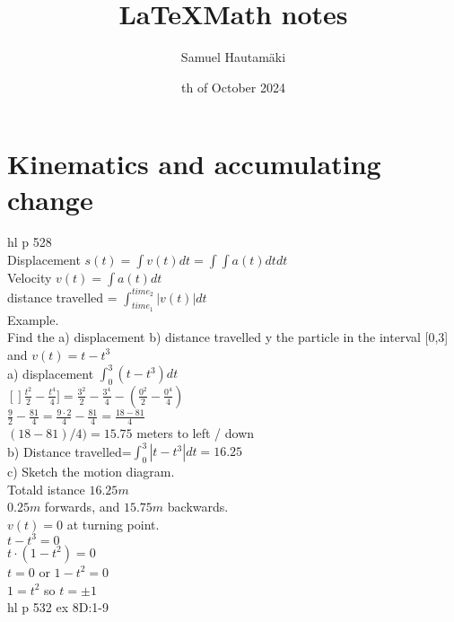 \documentclass{article}
\title{\LaTeX Math notes}
\author{Samuel Hautamäki}
\date{th of October 2024}
\begin{document}
  \maketitle
   
  \section{Kinematics and accumulating change}
  hl p 528\\
  Displacement $s(t)=\int v(t) dt=\int\int a(t) dt dt$\\
  Velocity $v(t)=\int a(t) dt$\\
  distance travelled = $\int_{time_1}^{time_2}|v(t)|dt$\\
  Example.\\
  Find the a) displacement b) distance travelled y the particle in the interval [0,3] and $v(t)=t-t^3$\\
  a) displacement $\int_{0}^{3} (t-t^3)dt$\\
  $[]\frac{t^2}{2}-\frac{t^4}{4}]=\frac{3^2}{2}-\frac{3^4}{4}-(\frac{0^2}{2}-\frac{0^4}{4})$\\
  $\frac{9}{2}-\frac{81}{4}=\frac{9\cdot2}{4}-\frac{81}{4}=\frac{18-81}{4}$\\
  $(18-81)/4)=15.75$ meters to left / down\\
  b) Distance travelled=$\int_{0}^{3}|t-t^3|dt=16.25$\\
  c) Sketch the motion diagram.\\
  Totald istance $16.25m$\\
  $0.25m$ forwards, and $15.75m$ backwards.\\
  $v(t)=0$ at turning point.\\
  $t-t^3=0$\\
  $t\cdot (1-t^2)=0$\\
  $t=0$ or $1-t^2=0$\\
  $1=t^2$ so $t=\pm1$\\
  hl p 532 ex 8D:1-9\\
  

   
\end{document}
